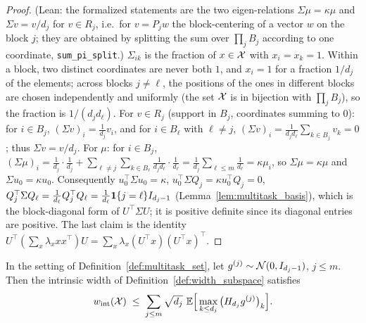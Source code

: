 \begin{proof}
\leanok
{}
(Lean: the formalized statements are the two eigen-relations $\Sigma\mu = \kappa\mu$ and
$\Sigma v = v/d_j$ for $v \in R_j$, i.e.\ for $v = P_jw$ the block-centering of a vector $w$
on the block $j$; they are obtained by splitting the sum over $\prod_jB_j$ according to one
coordinate, \texttt{sum\_pi\_split}.)
$\Sigma_{ik}$ is the fraction of $x \in \mathcal{X}$ with $x_i = x_k = 1$. Within a block, two
distinct coordinates are never both $1$, and $x_i = 1$ for a fraction $1/d_j$ of the
elements; across blocks $j \ne \ell$, the positions of the ones in different blocks are
chosen independently and uniformly (the set $\mathcal{X}$ is in bijection with $\prod_j B_j$), so the
fraction is $1/(d_jd_\ell)$. For $v \in R_j$ (support in $B_j$, coordinates summing to $0$):
for $i \in B_j$, $(\Sigma v)_i = \frac{1}{d_j}v_i$, and for $i \in B_\ell$ with
$\ell\ne j$, $(\Sigma v)_i = \frac{1}{d_jd_\ell}\sum_{k\in B_j}v_k = 0$; thus
$\Sigma v = v/d_j$. For $\mu$: for $i \in B_j$,
$(\Sigma\mu)_i = \frac{1}{d_j}\cdot\frac{1}{d_j} + \sum_{\ell\ne j}\sum_{k\in B_\ell}\frac{1}{d_jd_\ell}\cdot\frac1{d_\ell}
= \frac{1}{d_j}\sum_{\ell\le m}\frac{1}{d_\ell} = \kappa\mu_i$, so $\Sigma\mu = \kappa\mu$ and
$\Sigma u_0 = \kappa u_0$. Consequently $u_0^\top\Sigma u_0 = \kappa$,
$u_0^\top\Sigma Q_j = \kappa u_0^\top Q_j = 0$, $Q_j^\top\Sigma Q_\ell = \frac{1}{d_\ell}Q_j^\top Q_\ell
= \frac{1}{d_\ell}\mathbf{1}\{j=\ell\}I_{d_j-1}$ (Lemma~\ref{lem:multitask_basis}), which is the
block-diagonal form of $U^\top\Sigma U$; it is positive definite since its diagonal entries
are positive. The last claim is the identity $U^\top(\sum_x\lambda_x xx^\top)U =
\sum_x\lambda_x(U^\top x)(U^\top x)^\top$.
\end{proof}

\begin{lemma}\label{lem:multitask_width_reduction}
\leanok
{}
In the setting of Definition~\ref{def:multitask_set}, let $g^{(j)} \sim \mathcal{N}(0, I_{d_j-1})$,
$j \le m$. Then the intrinsic width of Definition~\ref{def:width_subspace} satisfies
\[
  w_{\mathrm{int}}(\mathcal{X}) \;\le\; \sum_{j\le m}\sqrt{d_j}\ \mathbb{E}\Big[\max_{k \le d_j}\big(H_{d_j}g^{(j)}\big)_k\Big].
\]
\end{lemma}

